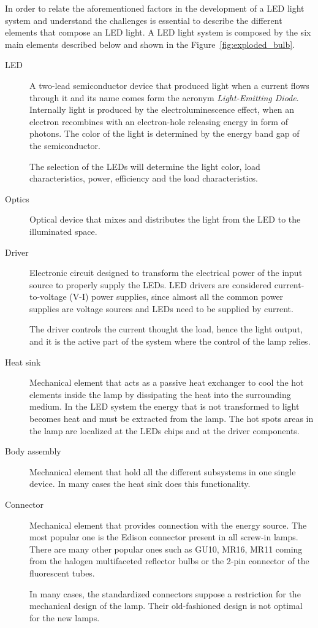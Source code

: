 In order to relate the aforementioned factors in the development of a LED light system and understand the challenges is essential to describe the different elements that compose an LED light. A LED light system is composed by the six main elements described below and shown in  the Figure~\ref{fig:exploded_bulb}.

\begin{description}
  \item[LED] A two-lead semiconductor device that produced light when a current flows through it and its name comes form the acronym \emph{Light-Emitting Diode}. Internally light is produced by the electroluminescence effect, when an electron recombines with an electron-hole releasing energy in form of photons. The color of the light is determined by the energy band gap of the semiconductor.

      The selection of the LEDs will determine the light color, load characteristics, power, efficiency and the load characteristics.

  \item[Optics] Optical device that mixes and distributes the light from the LED to the illuminated space.

  \item[Driver] Electronic circuit designed to transform the electrical power of the input source to properly supply the LEDs. LED drivers are considered current-to-voltage (V-I) power supplies, since almost all the common power supplies are voltage sources and LEDs need to be supplied by current.

      The driver controls the current thought the load, hence the light output, and it is the active part of the system where the control of the lamp relies.

  \item[Heat sink] Mechanical element that acts as a passive heat exchanger to cool the hot elements inside the lamp by dissipating the heat into the surrounding medium. In the LED system the energy that is not transformed to light becomes heat and must be extracted from the lamp. The hot spots areas in the lamp are localized at the LEDs chips and at the driver components.

  \item[Body assembly] Mechanical element that hold all the different subsystems in one single device. In many cases the heat sink does this functionality.

  \item[Connector] Mechanical element that provides connection with the energy source. The most popular one is the Edison connector present in all screw-in lamps. There are many other popular ones such as GU10, MR16, MR11 coming from the halogen multifaceted reflector bulbs or the 2-pin connector of the fluorescent tubes.

      In many cases, the standardized connectors suppose a restriction for the mechanical design of the lamp. Their old-fashioned design is not optimal for the new lamps.
\end{description}

